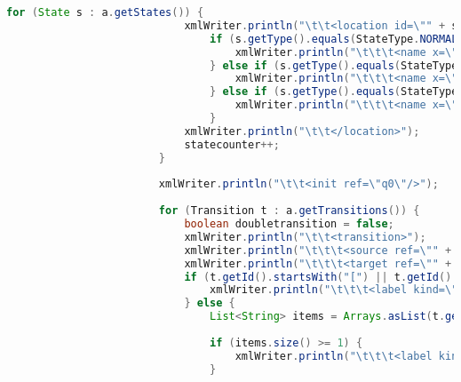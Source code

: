 \begin{lstlisting}[language=java, caption={példa unit teszteset.},captionpos=b]
						for (State s : a.getStates()) {
							xmlWriter.println("\t\t<location id=\"" + s.getId() + "\" x=\"" + statecounter + "\" y=\"" + statecounter + "\">");
								if (s.getType().equals(StateType.NORMAL)) {
									xmlWriter.println("\t\t\t<name x=\"" + statecounter + "\" y=\"" + (statecounter + 0.5) + "\">" + s.getId() + "</name>");
								} else if (s.getType().equals(StateType.ACCEPT)) {
									xmlWriter.println("\t\t\t<name x=\"" + statecounter + "\" y=\"" + (statecounter + 0.5) + "\">ACCEPT_" + s.getId() + "</name>");
								} else if (s.getType().equals(StateType.FINAL)) {
									xmlWriter.println("\t\t\t<name x=\"" + statecounter + "\" y=\"" + (statecounter + 0.5) + "\">FINAL_" + s.getId() + "</name>");
								}
							xmlWriter.println("\t\t</location>");
							statecounter++;
						}
						
						xmlWriter.println("\t\t<init ref=\"q0\"/>");
						
						for (Transition t : a.getTransitions()) {
							boolean doubletransition = false;
							xmlWriter.println("\t\t<transition>");
							xmlWriter.println("\t\t\t<source ref=\"" + t.getSender().getId() + "\"/>");
							xmlWriter.println("\t\t\t<target ref=\"" + t.getReceiver().getId() + "\"/>");
							if (t.getId().startsWith("[") || t.getId().startsWith("![")) {
								xmlWriter.println("\t\t\t<label kind=\"guard\" x=\"" + t.getSender().getId().substring(1) + ".5\" y=\"" + t.getSender().getId().substring(1) + ".5\">" + t.getId().substring(0, t.getId().indexOf("]")).replaceAll("<", "&lt;").replaceAll(">", "&gt;").replace("[", "") + "</label>");
							} else {
								List<String> items = Arrays.asList(t.getId().split("\\s*;\\s*"));
		
								if (items.size() >= 1) {
									xmlWriter.println("\t\t\t<label kind=\"synchronisation\" x=\"" + t.getSender().getId().substring(1) + ".5\" y=\"" + t.getSender().getId().substring(1) + ".5\">" + items.get(0).replaceAll("\\(", "_").replaceAll("\\)", "_").replaceAll("\\.", "__").replaceAll("!", "not").replaceAll("&", "_and_").replaceAll("\\s", "") + "?</label>");
								}
		

\end{lstlisting}
